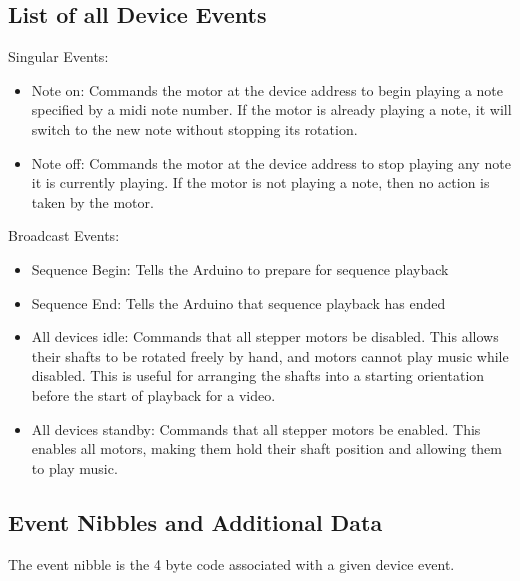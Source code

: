 \documentclass{article}
\begin{document}
\subsection{List of all Device Events}

\noindent Singular Events:
\begin{itemize}
    \item Note on: Commands the motor at the device address to begin playing a note specified by a midi note number. If the motor is already playing a note, it will switch to the new note without stopping its rotation.
    \item Note off: Commands the motor at the device address to stop playing any note it is currently playing. If the motor is not playing a note, then no action is taken by the motor.
\end{itemize}

\noindent Broadcast Events:
\begin{itemize}
    \item Sequence Begin: Tells the Arduino to prepare for sequence playback
    \item Sequence End: Tells the Arduino that sequence playback has ended
    \item All devices idle: Commands that all stepper motors be disabled. This allows their shafts to be rotated freely by hand, and motors cannot play music while disabled. This is useful for arranging the shafts into a starting orientation before the start of playback for a video.
    \item All devices standby: Commands that all stepper motors be enabled. This enables all motors, making them hold their shaft position and allowing them to play music.
\end{itemize}

\subsection{Event Nibbles and Additional Data}

\noindent The event nibble is the 4 byte code associated with a given device event.\\
\end{document}
